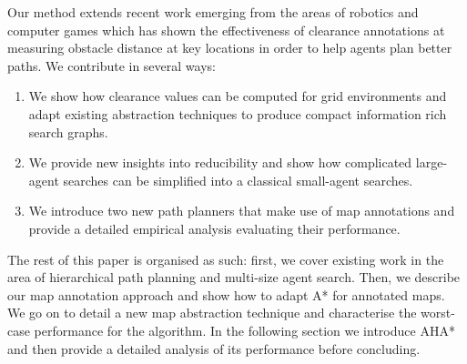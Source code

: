 Our method extends recent work emerging from the areas of robotics and computer games which has shown the effectiveness of clearance annotations at measuring obstacle distance at key locations in order to help agents plan better paths. We contribute in several ways:
\begin{enumerate}
\item{We show how clearance values can be computed for grid environments and adapt existing abstraction techniques to produce compact information rich search graphs.}
\item{We provide new insights into reducibility and show how complicated large-agent searches can be simplified into a classical small-agent searches.}
\item{We introduce two new path planners that make use of map annotations and provide a detailed empirical analysis evaluating their performance. }
\end{enumerate} 

The rest of this paper is organised as such: first, we cover existing work in the area of hierarchical path planning and multi-size agent search. Then, we describe our map annotation approach and show how to adapt A* for annotated maps. We go on to detail a new map abstraction technique and characterise the worst-case performance for the algorithm. In the following section we introduce AHA* and then provide a detailed analysis of its performance before concluding.
